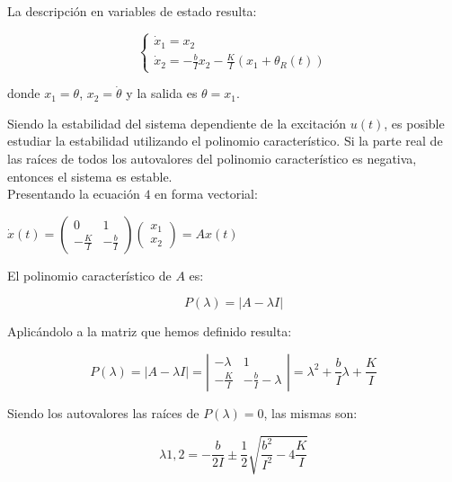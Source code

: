 \documentclass{sig-alternate}
\begin{document}
La descripci\'on en variables de estado resulta:

\begin{equation}
\label{var_estados_model1}
\begin{cases} 
    \dot x_1 = x_2 \\
    \dot x_2 = -\frac{b}{I} x_2 - \frac{K}{I} ( x_1 + \theta_R(t))
\end{cases}
\end{equation}

donde $x_1 = \theta$, $x_2 = \dot \theta$ y la salida es $\theta=x_1$.

Siendo la estabilidad del sistema dependiente de la excitaci\'{o}n $u(t)$,
es posible estudiar la estabilidad utilizando el polinomio caracter\'istico. 
Si la parte real de las ra\'{i}ces de
todos los autovalores del polinomio caracter\'istico es negativa, entonces 
el sistema es estable.\\
Presentando la ecuaci\'{o}n $4$ en forma vectorial:
\begin{center}
$
\dot x(t) = 
\left( \begin{array}{cc}
0 & 1 \\
-\frac{K}{I} & -\frac{b}{I}
\end{array} \right)
\left( \begin{array}{c}
x_1 \\
x_2
\end{array} \right)
= Ax(t)
$
\end{center}
El polinomio caracter\'istico de $A$ es:

\begin{equation}
 P( \lambda ) = |A - \lambda I|
\end{equation}

Aplic\'{a}ndolo a la matriz que hemos definido resulta:

\begin{equation}
 P( \lambda ) = |A - \lambda I| = 
\left| \begin{array}{cc}
-\lambda & 1 \\
-\frac{K}{I} & -\frac{b}{I}-\lambda
\end{array} \right| 
=
\lambda^2 + \frac{b}{I} \lambda + \frac{K}{I}
\end{equation}

Siendo los autovalores las ra\'ices de $P(\lambda) = 0$, las mismas son:

\begin{equation}
 \lambda{1,2} = - \frac{b}{2I} \pm \frac{1}{2} \sqrt{\frac{b^2}{I^2}-4\frac{K}{I}}
\end{equation}
\end{document}

